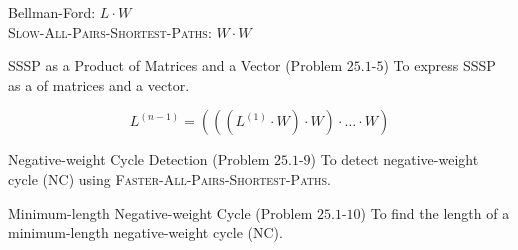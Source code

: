 \begin{frame}{}
  
\end{frame}

\begin{frame}{}
  

  \vspace{-0.20cm}
\end{frame}

\begin{frame}{}
  \begin{center}
    Bellman-Ford: $L \cdot W$ \\[20pt]
    \textsc{Slow-All-Pairs-Shortest-Paths}: $W \cdot W$ \\[40pt]

    \pause
  \end{center}
\end{frame}

\begin{frame}{}
  \begin{exampleblock}{SSSP as a Product of Matrices and a Vector (Problem $25.1$-$5$)}
    To express SSSP as a  of matrices and a vector.
  \end{exampleblock}

  \vspace{0.60cm}
  \[
    L^{(n-1)} = \left(\left(\left(L^{(1)} \cdot W \right) \cdot W \right) \cdot \ldots \cdot W\right)
  \]

  \pause
  \vspace{0.60cm}
  \begin{center}
  \end{center}
\end{frame}

\begin{frame}{}
  \begin{exampleblock}{Negative-weight Cycle Detection (Problem $25.1$-$9$)}
    To detect negative-weight cycle (\textsf{NC}) using \textsc{Faster-All-Pairs-Shortest-Paths}.
  \end{exampleblock}
\end{frame}

\begin{frame}{}
  \begin{exampleblock}{Minimum-length Negative-weight Cycle (Problem $25.1$-$10$)}
    To find the length of a minimum-length negative-weight cycle (\textsf{NC}).
  \end{exampleblock}
\end{frame}
